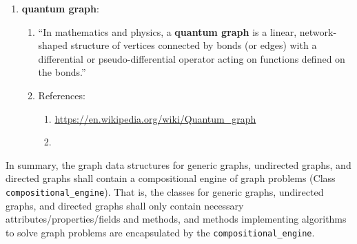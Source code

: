 \begin{enumerate}
\begin{enumerate}
\begin{enumerate}
		\end{enumerate}
	\end{enumerate}
\item {\bf quantum graph}: \vspace{-0.3cm}
	\begin{enumerate} \itemsep -2pt
	\item ``In mathematics and physics, a {\bf quantum graph} is a linear, network-shaped structure of vertices connected by bonds (or edges) with a differential or pseudo-differential operator acting on functions defined on the bonds.''
	\item References: \vspace{-0.2cm}
		\begin{enumerate} \itemsep -2pt
		\item \url{https://en.wikipedia.org/wiki/Quantum_graph}
		\item \cite{Lovasz2012}
		\end{enumerate}
	\end{enumerate}
\end{enumerate}


In summary, the graph data structures for generic graphs, undirected graphs, and directed graphs shall contain a compositional engine of graph problems (Class {\tt compositional\_engine}). That is, the classes for generic graphs, undirected graphs, and directed graphs shall only contain necessary attributes/properties/fields and methods, and methods implementing algorithms to solve graph problems are encapsulated by the {\tt compositional\_engine}.\\

